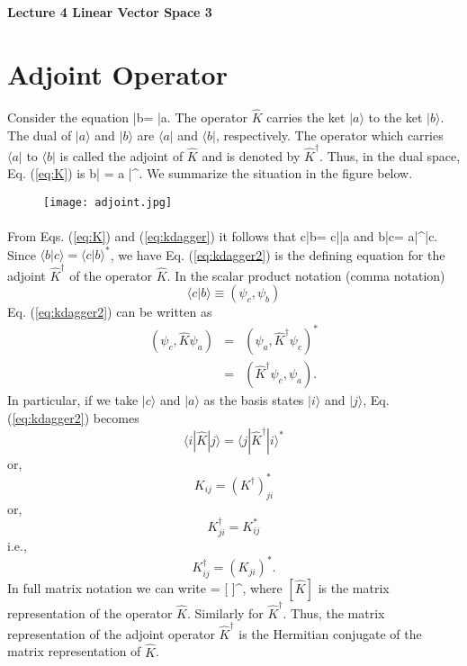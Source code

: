 


\begin{Large}
\noindent
{\bf Lecture 4 \newline
Linear Vector Space 3}
\end{Large}
\vspace{1 cm}

\section{Adjoint Operator}
Consider the equation
\be
|b\rangle =  |a\rangle.
\label{eq:K}
\ee
The operator $\hat{K}$ carries the ket $|a\rangle$ to the ket $|b\rangle$. The dual of $|a\rangle$ and $|b\rangle$ are 
$\langle a|$ and $\langle b|$, respectively. The operator which carries $\langle a|$ to $\langle b|$ is called the 
adjoint of $\hat{K}$ and is denoted by $\hat{K}^{\dagger}$. Thus, in the dual space, Eq. (\ref{eq:K}) is
\be
\langle b| = \langle a |^{\dag}.
\label{eq:kdagger}
\ee
We summarize the situation in the figure below.
\begin{figure}[h]
\centering
\texttt{[image: adjoint.jpg]}
\end{figure}

\paragraph{}
From Eqs. (\ref{eq:K}) and (\ref{eq:kdagger}) it follows that
\be
\langle c|b\rangle = \langle c||a\rangle 
\ee
and
\be
\langle b|c\rangle = \langle a|^{\dag}|c\rangle .
\ee
Since $\langle b|c\rangle = \langle c|b\rangle^*$, we have
\be
{}
\label{eq:kdagger2}
\ee
Eq. (\ref{eq:kdagger2}) is the defining equation for the adjoint $\hat{K}^{\dag}$ of the operator $\hat{K}$.
In the scalar product notation (comma notation)
\[ \langle c|b\rangle \equiv (\psi_c, \psi_b) \]
Eq. (\ref{eq:kdagger2}) can be written as
\begin{eqnarray}
(\psi_c, \hat{K} \psi_a) &=& (\psi_a, \hat{K}^{\dag} \psi_c)^* \nonumber \\
&=& (\hat{K}^{\dag}\psi_c,\psi_a).
\end{eqnarray}
In particular, if we take $|c\rangle$ and $|a\rangle$ as the basis states $|i\rangle$ and $|j\rangle$, Eq. (\ref{eq:kdagger2}) 
becomes
\[ \langle i |\hat{K}|j\rangle = \langle j|\hat{K}^{\dag}|i\rangle^* \]
or,
\[ K_{ij}= \left(K^{\dag}\right)_{ji}^* \]
or,
\[ K^{\dag}_{ji}=K_{ij}^* \]
i.e.,
\[ K^{\dag}_{ij} = (K_{ji})^*.\]
In full matrix notation we can write
 = [  ]^{\dag},
\ee
where $[ \hat{K} ]$ is the matrix representation of the operator $\hat{K}$. Similarly for $\hat{K}^{\dag}$. Thus, the matrix representation
of the adjoint operator $\hat{K}^{\dagger}$ is the Hermitian conjugate of the matrix representation of $\hat{K}$.

